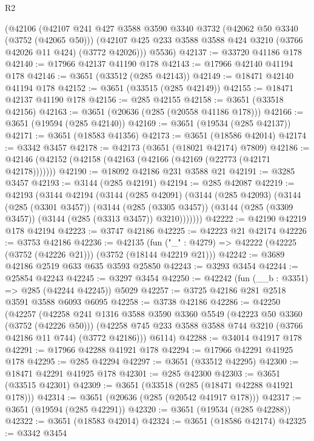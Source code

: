 \begin{lexlean}{R2}
\begin{coremodule}
    (@42106
      (@42107
        @241
        @427
        @3588
        @3590
        @3340
        @3732
        (@42062 @50 @3340 (@3752 (@42065 @50)))
        (@42107 @425 @233 @3588 @3588 @424 @3210 (@3766 @42026 @11 @424) (@3772 @42026)))
      @5536)
@42137 := @33720 @41186 @178
@42140 := @17966 @42137 @41190 @178
@42143 := @17966 @42140 @41194 @178
@42146 := @3651 (@33512 (@285 @42143))
@42149 := @18471 @42140 @41194 @178
@42152 := @3651 (@33515 (@285 @42149))
@42155 := @18471 @42137 @41190 @178
@42156 := @285 @42155
@42158 := @3651 (@33518 @42156)
@42163 := @3651 (@20636 (@285 (@20558 @41186 @178)))
@42166 := @3651 (@19594 (@285 @42140))
@42169 := @3651 (@19534 (@285 @42137))
@42171 := @3651 (@18583 @41356)
@42173 := @3651 (@18586 @42014)
@42174 := @3342 @3457
@42178 := @42173 (@3651 (@18021 @42174) @7809)
@42186 := @42146 (@42152 (@42158 (@42163 (@42166 (@42169 (@22773 (@42171 @42178)))))))
@42190 := @18092 @42186 @231 @3588 @21
@42191 := @3285 @3457
@42193 := @3144 (@285 @42191)
@42194 := @285 @42087
@42219 := @42193
    (@3144
      @42194
      (@3144
        (@285 @42091)
        (@3144
          (@285 @42093)
          (@3144
            (@285 (@3301 @3457))
            (@3144
              (@285 (@3305 @3457))
              (@3144 (@285 (@3309 @3457)) (@3144 (@285 (@3313 @3457)) @3210)))))))
@42222 := @42190 @42219 @178 @42194
@42223 := @3747 @42186
@42225 := @42223 @21 @42174
@42226 := @3753 @42186
@42236 := @42135
    (fun ("_" : @4279) => @42222 (@42225 (@3752 (@42226 @21))) (@3752 (@18144 @42219 @21)))
@42242 := @3689 @42186 @2519 @633 @635 @3593 @25850
@42243 := @3293 @3454
@42244 := @25854 @42243
@42245 := @3297 @3454
@42250 := @42242 (fun (__b : @3351) => @285 (@42244 @42245)) @5029
@42257 := @3725 @42186 @281 @2518 @3591 @3588 @6093 @6095
@42258 := @3738 @42186
@42286 := @42250
    (@42257
      (@42258
        @241
        @1316
        @3588
        @3590
        @3360
        @5549
        (@42223 @50 @3360 (@3752 (@42226 @50)))
        (@42258 @745 @233 @3588 @3588 @744 @3210 (@3766 @42186 @11 @744) (@3772 @42186)))
      @6114)
@42288 := @34014 @41917 @178
@42291 := @17966 @42288 @41921 @178
@42294 := @17966 @42291 @41925 @178
@42295 := @285 @42294
@42297 := @3651 (@33512 @42295)
@42300 := @18471 @42291 @41925 @178
@42301 := @285 @42300
@42303 := @3651 (@33515 @42301)
@42309 := @3651 (@33518 (@285 (@18471 @42288 @41921 @178)))
@42314 := @3651 (@20636 (@285 (@20542 @41917 @178)))
@42317 := @3651 (@19594 (@285 @42291))
@42320 := @3651 (@19534 (@285 @42288))
@42322 := @3651 (@18583 @42014)
@42324 := @3651 (@18586 @42174)
@42325 := @3342 @3454

\end{coremodule}
\end{lexlean}
